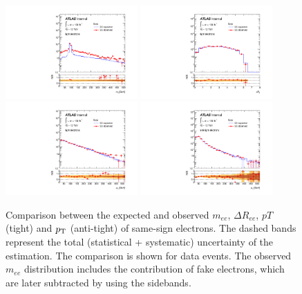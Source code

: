 \begin{figure}[htb!]
\centering
  \includegraphics[width=0.45\textwidth]{figures/qmisid/valid_MlltightData}
  \includegraphics[width=0.45\textwidth]{figures/qmisid/valid_DRlltightData}\\
  \includegraphics[width=0.45\textwidth]{figures/qmisid/valid_PttightData}
  \includegraphics[width=0.45\textwidth]{figures/qmisid/valid_PtatightData}\\
  \caption{Comparison between the expected and observed $m_{ee}$, ${\Delta}R_{ee}$, $pT$ (tight) and $p_{\mathrm{T}}$ (anti-tight) of same-sign electrons.  The dashed bands represent the total (statistical + systematic) uncertainty of the estimation. The comparison is shown for data events. The observed $m_{ee}$ distribution includes the contribution of fake electrons, which are later subtracted by using the sidebands.\label{fig:clData}}
\end{figure}


